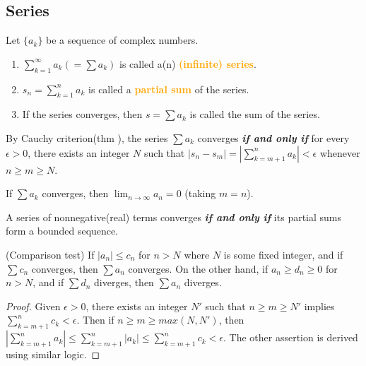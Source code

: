 \subsection{Series}
\begin{definition}
[pma 3.21]
Let $\{a_k\}$ be a sequence of complex numbers.
\begin{enumerate}[label={(\arabic*)}]
\item $\sum\limits_{k=1}^{\infty}a_k(=\sum a_k)$ is called a(n) \textbf{\textcolor{orange}{(infinite) series}}.
\item $s_n=\sum\limits_{k=1}^{n}a_k$ is called a \textbf{\textcolor{orange}{partial sum}} of the series.
\item If the series converges, then $s=\sum a_k$ is called the sum of the series.
\end{enumerate}
\end{definition}

\begin{theorem}
[pma 3.22]
\label{thm:conv_series}
By Cauchy criterion(thm ), the series $\sum a_k$ converges \textbf{\emph{if and only if}} for every $\epsilon>0$, there exists an integer $N$ such that $|s_n-s_m|=|\sum_{k=m+1}^{n}a_k|<\epsilon$ whenever $n\geq m\geq N$.
\end{theorem}

\begin{theorem}
[pma 3.23]
\label{thm:conv_series_implies_lim_zero}
If $\sum a_k$ converges, then $\lim_{n\to \infty}a_n = 0$ (taking $m=n$).
\end{theorem}

\begin{theorem}
[pma 3.24]
\label{thm:conv_nonnegative_series}
A series of nonnegative(real) terms converges \textbf{\emph{if and only if}} its partial sums form a bounded sequence.
\end{theorem}

\begin{theorem}
[pma 3.25]
\label{thm:comparison_test}
(Comparison test) If $|a_n|\leq c_n$ for $n>N$ where $N$ is some fixed integer, and if $\sum c_n$ converges, then $\sum a_n$ converges. On the other hand, if $a_n\geq d_n\geq 0$ for $n>N$, and if $\sum d_n$ diverges, then $\sum a_n$ diverges.
\end{theorem}
\begin{proof}
Given $\epsilon>0$, there exists an integer $N'$ such that $n\geq m\geq N'$ implies $\sum_{k=m+1}^{n}c_k < \epsilon$. Then if $n\geq m\geq max(N,N')$, then $|\sum_{k=m+1}^{n}a_k|\leq \sum_{k=m+1}^{n}|a_k|\leq \sum_{k=m+1}^{n}c_k<\epsilon$. The other assertion is derived using similar logic.
\end{proof}

